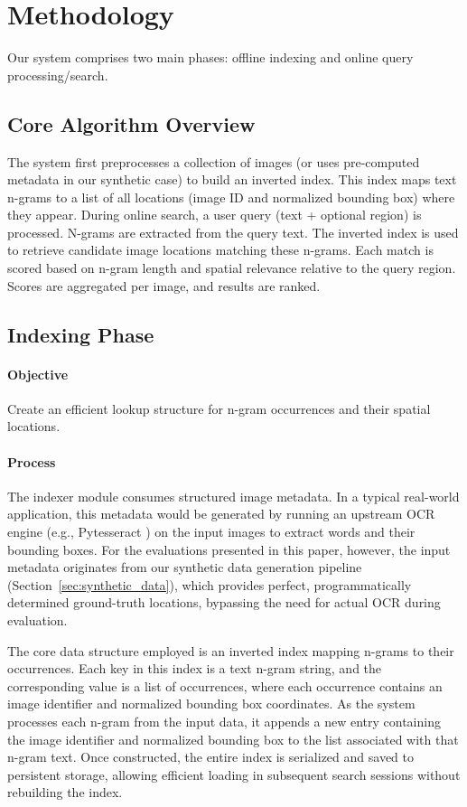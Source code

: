\documentclass[sigconf,screen]{acmart}
\begin{document}
\section{Methodology}

Our system comprises two main phases: offline indexing and online query processing/search.

\subsection{Core Algorithm Overview}

The system first preprocesses a collection of images (or uses pre-computed metadata in our synthetic case) to build an inverted index. This index maps text n-grams to a list of all locations (image ID and normalized bounding box) where they appear. During online search, a user query (text + optional region) is processed. N-grams are extracted from the query text. The inverted index is used to retrieve candidate image locations matching these n-grams. Each match is scored based on n-gram length and spatial relevance relative to the query region. Scores are aggregated per image, and results are ranked.

\subsection{Indexing Phase}

\paragraph{Objective} Create an efficient lookup structure for n-gram occurrences and their spatial locations.

\paragraph{Process} The indexer module consumes structured image metadata. In a typical real-world application, this metadata would be generated by running an upstream OCR engine (e.g., Pytesseract \cite{Smith2007AnOV}) on the input images to extract words and their bounding boxes. For the evaluations presented in this paper, however, the input metadata originates from our synthetic data generation pipeline (Section~\ref{sec:synthetic_data}), which provides perfect, programmatically determined ground-truth locations, bypassing the need for actual OCR during evaluation.

The core data structure employed is an inverted index mapping n-grams to their occurrences. Each key in this index is a text n-gram string, and the corresponding value is a list of occurrences, where each occurrence contains an image identifier and normalized bounding box coordinates. As the system processes each n-gram from the input data, it appends a new entry containing the image identifier and normalized bounding box to the list associated with that n-gram text. Once constructed, the entire index is serialized and saved to persistent storage, allowing efficient loading in subsequent search sessions without rebuilding the index.
\end{document}
